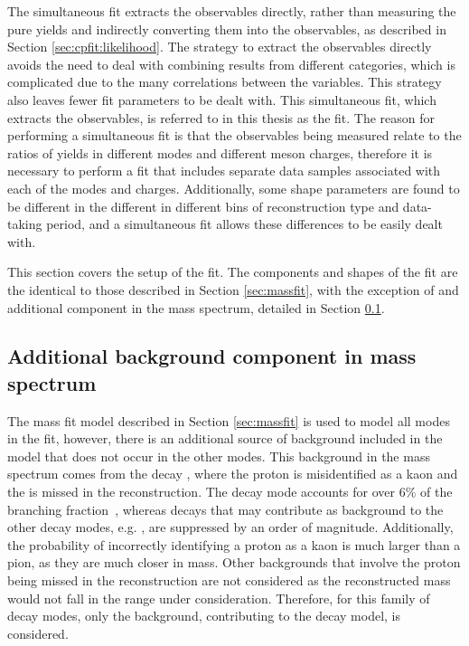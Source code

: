 The simultaneous fit extracts the \CP observables directly, rather than measuring the pure yields and indirectly converting them into the \CP observables, as described in Section \ref{sec:cpfit:likelihood}. The strategy to extract the \CP observables directly avoids the need to deal with combining results from different categories, which is complicated due to the many correlations between the variables. This strategy also leaves fewer fit parameters to be dealt with. This simultaneous fit, which extracts the \CP observables, is referred to in this thesis as the \CP fit. The reason for performing a simultaneous fit is that the \CP observables being measured relate to the ratios of yields in different \Dz modes and different \B meson charges, therefore it is necessary to perform a fit that includes separate data samples associated with each of the modes and charges. Additionally, some shape parameters are found to be different in the different in different bins of \KS reconstruction type and data-taking period, and a simultaneous fit allows these differences to be easily dealt with. 

This section covers the setup of the \CP fit. The components and shapes of the \CP fit are the identical to those described in Section \ref{sec:massfit}, with the exception of and additional component in the \kk mass spectrum, detailed in Section \ref{sec:cpfit:Lb2LcKst}.

\subsection{Additional background component in \kk mass spectrum}
\label{sec:cpfit:Lb2LcKst}

The mass fit model described in Section \ref{sec:massfit} is used to model all \Dz modes in the \CP fit, however, there is an additional source of background included in the \kk model that does not occur in the other modes. This background in the \kk \Bm mass spectrum comes from the decay , where the proton is misidentified as a kaon and the \pion is missed in the reconstruction. The decay mode  accounts for over 6\% of the \Lc branching fraction~\cite{PDG2016}, whereas \Lc decays that may contribute as background to the other \Dz decay modes, e.g. , are suppressed by an order of magnitude. Additionally, the probability of incorrectly identifying a proton as a kaon is much larger than a pion, as they are much closer in mass. Other backgrounds that involve the proton being missed in the reconstruction are not considered as the reconstructed \Bm mass would not fall in the range under consideration. Therefore, for this family of decay modes, only the  background, contributing to the \kk decay model, is considered.

